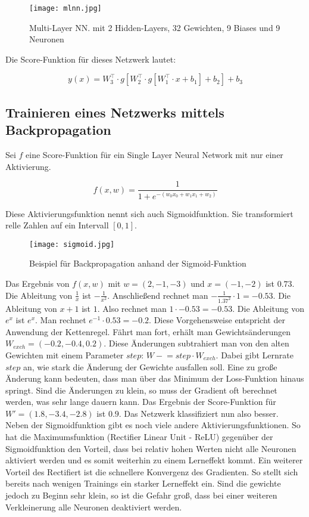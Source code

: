 \documentclass[11pt,ceqn]{book}
\newcommand{\minuseq}{\mathrel{-}=}
\begin{document}
\begin{figure}[H]
\centering
\texttt{[image: mlnn.jpg]}
\caption{Multi-Layer NN. mit 2 Hidden-Layers, 32 Gewichten, 9 Biases und 9 Neuronen}
\end{figure}

Die Score-Funktion für dieses Netzwerk lautet:

\[y(x) = W_3^{\top} \cdot g[W_2^{\top} \cdot g[W_1^{\top} \cdot x+b_1]+b_2]+b_3\]


\subsection{Trainieren eines Netzwerks mittels Backpropagation}
Sei $f$ eine Score-Funktion für ein Single Layer Neural Network mit nur einer Aktivierung.

\[f(x,w) = \frac{1}{1+e^{-(w_0x_0+w_1x_1+w_2)}}\]

Diese Aktivierungsfunktion nennt sich auch Sigmoidfunktion. Sie transformiert relle Zahlen auf ein Intervall $\left[0, 1\right]$.

\begin{figure}[H]
\centering
\texttt{[image: sigmoid.jpg]}
\caption{Beispiel für Backpropagation anhand der Sigmoid-Funktion}
\end{figure}

Das Ergebnis von $f(x,w)$ mit $w = (2,-1,-3)$ und $x = (-1,-2)$ ist $0.73$. Die Ableitung von  $\frac{1}{x}$ ist $-\frac{1}{x^2}$. Anschließend rechnet man $-\frac{1}{1.37^2}\cdot 1 = -0.53$. Die Ableitung von $x+1$ ist $1$. Also rechnet man $1\cdot -0.53=-0.53$. Die Ableitung von $e^x$ ist $e^x$. Man rechnet $e^{-1}\cdot 0.53=-0.2$. Diese Vorgehensweise entspricht der Anwendung der Kettenregel. Fährt man fort, erhält man Gewichtsänderungen $W_{exch}=(-0.2,-0.4,0.2)$. Diese Änderungen subtrahiert man von den alten Gewichten mit einem Parameter $step$: $W \minuseq step \cdot W_{exch}$. Dabei gibt Lernrate $step$ an, wie stark die Änderung der Gewichte ausfallen soll. Eine zu große Änderung kann bedeuten, dass man über das Minimum der Loss-Funktion hinaus springt. Sind die Änderungen zu klein, so muss der Gradient oft berechnet werden, was sehr lange dauern kann. Das Ergebnis der Score-Funktion für $W' = (1.8,-3.4,-2.8)$ ist $0.9$. Das Netzwerk klassifiziert nun also besser.\\
\bigskip
Neben der Sigmoidfunktion gibt es noch viele andere Aktivierungsfunktionen. So hat die Maximumsfunktion (Rectifier Linear Unit - ReLU) gegenüber der Sigmoidfunktion den Vorteil, dass bei relativ hohen Werten nicht alle Neuronen aktiviert werden und es somit weiterhin zu einem Lerneffekt kommt. Ein weiterer Vorteil des Rectifiert ist die schnellere Konvergenz des Gradienten. So stellt sich bereits nach wenigen Trainings ein starker Lerneffekt ein. Sind die gewichte jedoch zu Beginn sehr klein, so ist die Gefahr groß, dass bei einer weiteren Verkleinerung alle Neuronen deaktiviert werden.
\end{document}

